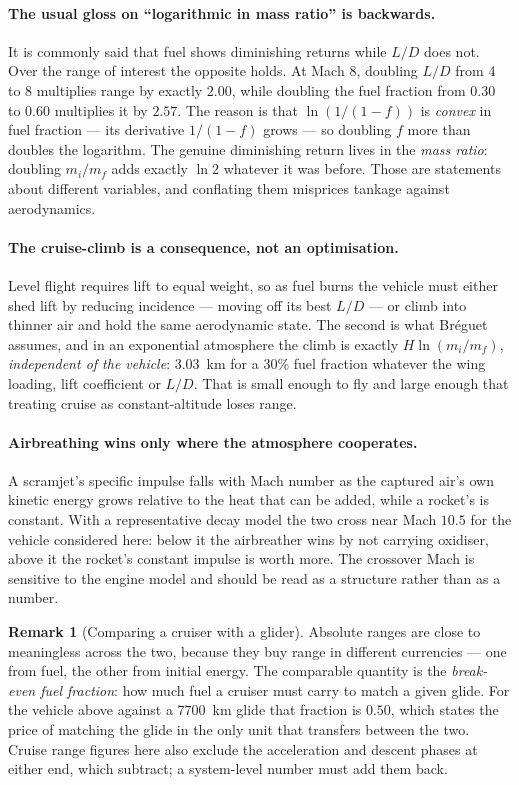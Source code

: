 \documentclass[11pt,a4paper]{article}
\theoremstyle{definition}
\newtheorem{remark}[theorem]{Remark}
\numberwithin{equation}{section}
\begin{document}
\paragraph{The usual gloss on ``logarithmic in mass ratio'' is backwards.} It is commonly said that fuel shows diminishing returns while $L/D$ does not. Over the range of interest the opposite holds. At Mach 8, doubling $L/D$ from 4 to 8 multiplies range by exactly $2.00$, while doubling the fuel fraction from $0.30$ to $0.60$ multiplies it by $2.57$. The reason is that $\ln(1/(1-f))$ is \emph{convex} in fuel fraction --- its derivative $1/(1-f)$ grows --- so doubling $f$ more than doubles the logarithm. The genuine diminishing return lives in the \emph{mass ratio}: doubling $m_i/m_f$ adds exactly $\ln 2$ whatever it was before. Those are statements about different variables, and conflating them misprices tankage against aerodynamics.

\paragraph{The cruise-climb is a consequence, not an optimisation.} Level flight requires lift to equal weight, so as fuel burns the vehicle must either shed lift by reducing incidence --- moving off its best $L/D$ --- or climb into thinner air and hold the same aerodynamic state. The second is what Br\'eguet assumes, and in an exponential atmosphere the climb is exactly $H\ln(m_i/m_f)$, \emph{independent of the vehicle}: $3.03$~km for a $30\%$ fuel fraction whatever the wing loading, lift coefficient or $L/D$. That is small enough to fly and large enough that treating cruise as constant-altitude loses range.

\paragraph{Airbreathing wins only where the atmosphere cooperates.} A scramjet's specific impulse falls with Mach number as the captured air's own kinetic energy grows relative to the heat that can be added, while a rocket's is constant. With a representative decay model the two cross near Mach $10.5$ for the vehicle considered here: below it the airbreather wins by not carrying oxidiser, above it the rocket's constant impulse is worth more. The crossover Mach is sensitive to the engine model and should be read as a structure rather than as a number.

\begin{remark}[Comparing a cruiser with a glider]
Absolute ranges are close to meaningless across the two, because they buy range in different currencies --- one from fuel, the other from initial energy. The comparable quantity is the \emph{break-even fuel fraction}: how much fuel a cruiser must carry to match a given glide. For the vehicle above against a $7700$~km glide that fraction is $0.50$, which states the price of matching the glide in the only unit that transfers between the two. Cruise range figures here also exclude the acceleration and descent phases at either end, which subtract; a system-level number must add them back.
\end{remark}
\end{document}
